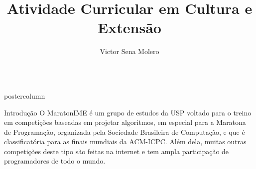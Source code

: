 \documentclass[final]{beamer}
\title{\huge Atividade Curricular em Cultura e Extensão}
\author{Victor Sena Molero}
\institute[Universidade de São Paulo] %
{
    Instituto de Matemática e Estatística, Universidade de São Paulo
}
\date{}
\newlength{\columnheight}
\begin{document}
\begin{frame}
\begin{columns}
\begin{column}{.5\textwidth}
\begin{beamercolorbox}[center,wd=\textwidth]{postercolumn}
\begin{minipage}[T]{.95\textwidth} %
\parbox[t][\columnheight]{\textwidth}{ %
    \begin{block}{Introdução}
        O MaratonIME é um grupo de estudos da USP voltado para o treino em competições baseadas em projetar algoritmos, em especial para a Maratona de Programação, organizada pela Sociedade Brasileira de Computação, e que é classificatória para as finais mundiais da ACM-ICPC. Além dela, muitas outras competições deste tipo são feitas na internet e tem ampla participação de programadores de todo o mundo.
    \end{block}

}
\end{minipage}
\end{beamercolorbox}
\end{column}
\end{columns}
\end{frame}
\end{document}
